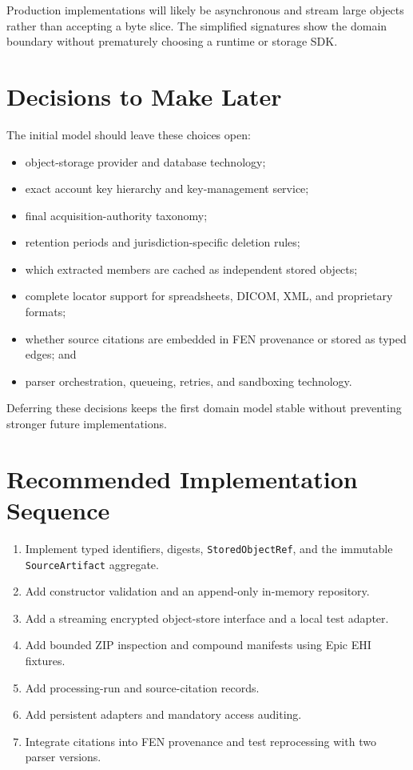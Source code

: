 \documentclass[11pt]{article}
\newcommand{\code}[1]{\texttt{#1}}
\begin{document}
Production implementations will likely be asynchronous and stream large objects rather than accepting a byte slice. The simplified signatures show the domain boundary without prematurely choosing a runtime or storage SDK.

\section{Decisions to Make Later}

The initial model should leave these choices open:

\begin{itemize}
  \item object-storage provider and database technology;
  \item exact account key hierarchy and key-management service;
  \item final acquisition-authority taxonomy;
  \item retention periods and jurisdiction-specific deletion rules;
  \item which extracted members are cached as independent stored objects;
  \item complete locator support for spreadsheets, DICOM, XML, and proprietary formats;
  \item whether source citations are embedded in FEN provenance or stored as typed edges; and
  \item parser orchestration, queueing, retries, and sandboxing technology.
\end{itemize}

Deferring these decisions keeps the first domain model stable without preventing stronger future implementations.

\section{Recommended Implementation Sequence}

\begin{enumerate}
  \item Implement typed identifiers, digests, \code{StoredObjectRef}, and the immutable \code{SourceArtifact} aggregate.
  \item Add constructor validation and an append-only in-memory repository.
  \item Add a streaming encrypted object-store interface and a local test adapter.
  \item Add bounded ZIP inspection and compound manifests using Epic EHI fixtures.
  \item Add processing-run and source-citation records.
  \item Add persistent adapters and mandatory access auditing.
  \item Integrate citations into FEN provenance and test reprocessing with two parser versions.
\end{enumerate}
\end{document}
